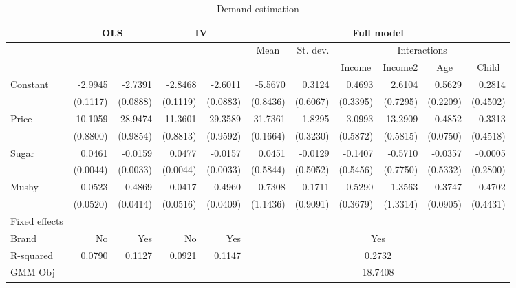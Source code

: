 \documentclass[12pt,english]{article}
\begin{document}
\begin{enumerate}
\begin{table}[H]
  \centering
  \scriptsize
  \caption{Demand estimation}
    \begin{tabular}{lrrrrrrrrrr}
    \hline
          & \multicolumn{2}{c}{OLS} & \multicolumn{2}{c}{IV} & \multicolumn{6}{c}{Full model} \\
    \hline
          & \multicolumn{1}{c}{} & \multicolumn{1}{c}{} & \multicolumn{1}{c}{} & \multicolumn{1}{c}{} & \multicolumn{1}{c}{Mean} & St. dev. & \multicolumn{4}{c}{Interactions} \\
          \cline{6-11}
          & \multicolumn{1}{c}{} & \multicolumn{1}{c}{} & \multicolumn{1}{c}{} & \multicolumn{1}{c}{} & \multicolumn{1}{c}{} &       & \multicolumn{1}{c}{Income} & \multicolumn{1}{c}{Income2} & \multicolumn{1}{c}{Age} & \multicolumn{1}{c}{Child} \\
          \hline
    Constant & -2.9945 & -2.7391 & -2.8468 & -2.6011 & -5.5670 & 0.3124 & 0.4693 & 2.6104 & 0.5629 & 0.2814 \\
          & (0.1117) & (0.0888) & (0.1119) & (0.0883) & (0.8436) & (0.6067) & (0.3395) & (0.7295) & (0.2209) & (0.4502) \\
    Price & -10.1059 & -28.9474 & -11.3601 & -29.3589 & -31.7361 & 1.8295 & 3.0993 & 13.2909 & -0.4852 & 0.3313 \\
          & (0.8800) & (0.9854) & (0.8813) & (0.9592) & (0.1664) & (0.3230) & (0.5872) & (0.5815) & (0.0750) & (0.4518) \\
    Sugar & 0.0461 & -0.0159 & 0.0477 & -0.0157 & 0.0451 & -0.0129 & -0.1407 & -0.5710 & -0.0357 & -0.0005 \\
          & (0.0044) & (0.0033) & (0.0044) & (0.0033) & (0.5844) & (0.5052) & (0.5456) & (0.7750) & (0.5332) & (0.2800) \\
    Mushy & 0.0523 & 0.4869 & 0.0417 & 0.4960 & 0.7308 & 0.1711 & 0.5290 & 1.3563 & 0.3747 & -0.4702 \\
          & (0.0520) & (0.0414) & (0.0516) & (0.0409) & (1.1436) & (0.9091) & (0.3679) & (1.3314) & (0.0905) & (0.4431) \\
          \hline
    Fixed effects &       &       &       &       &       &       &       &       &       &  \\
    \cline{1-1}
    Brand & No    & Yes   & No    & Yes   & \multicolumn{6}{c}{Yes} \\
    \hline
    R-squared & 0.0790 & 0.1127 & 0.0921 & 0.1147 & \multicolumn{6}{c}{0.2732} \\
    GMM Obj &       &       &       &       & \multicolumn{6}{c}{18.7408} \\
    \hline
    \end{tabular}%
  \label{t3}%
\end{table}



\end{enumerate}
\end{document}
